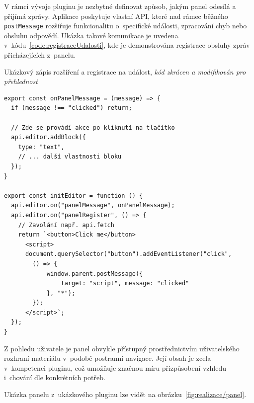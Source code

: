 V rámci vývoje pluginu je nezbytné definovat způsob, jakým panel odesílá a přijímá zprávy. 
Aplikace poskytuje vlastní API, které nad rámec běžného \texttt{postMessage} rozšiřuje funkcionalitu o~specifické události, zpracování chyb nebo obsluhu odpovědí. 
Ukázka takové komunikace je uvedena v~kódu~\ref{code:registraceUdalosti}, kde je demonstrována registrace obsluhy zpráv přicházejících z~panelu.

\begin{listing}[ht!]
\caption[Ukázkový zápis rozšíření a registrace na událost]{Ukázkový zápis rozšíření a registrace na událost, \textit{kód zkrácen a modifikován pro přehlednost}}\label{code:registraceUdalosti}
\begin{verbatim}
export const onPanelMessage = (message) => {
  if (message !== "clicked") return;

  // Zde se provádí akce po kliknutí na tlačítko
  api.editor.addBlock({
    type: "text",
    // ... další vlastnosti bloku
  });
}

export const initEditor = function () {
  api.editor.on("panelMessage", onPanelMessage);
  api.editor.on("panelRegister", () => {
    // Zavolání např. api.fetch
    return `<button>Click me</button>
      <script>
      document.querySelector("button").addEventListener("click", 
        () => {
            window.parent.postMessage({
                target: "script", message: "clicked"
            }, "*");
        });
      </script>`;
  });
}
\end{verbatim}
\end{listing}

Z pohledu uživatele je panel obvykle přístupný prostřednictvím uživatelského rozhraní materiálu v~podobě postranní navigace. 
Její obsah je zcela v~kompetenci pluginu, což umožňuje značnou míru přizpůsobení vzhledu i~chování dle konkrétních potřeb.

Ukázka panelu z~ukázkového pluginu lze vidět na obrázku~\ref{fig:realizace/panel}.




